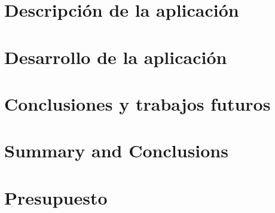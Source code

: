 \documentclass[spanish,a4paper,11pt,twoside]{report}
\begin{document}
\newpage{\pagestyle{empty}\cleardoublepage}
\thispagestyle{empty}


\chapter{Descripción de la aplicaci\'on}
\label{chapter:tres}



\newpage{\pagestyle{empty}\cleardoublepage}
\thispagestyle{empty}


\chapter{Desarrollo de la aplicaci\'on}
\label{chapter:cuatro}



\newpage{\pagestyle{empty}\cleardoublepage}
\thispagestyle{empty}

\chapter{Conclusiones y trabajos futuros}
\label{chapter:Conclusiones}



\newpage{\pagestyle{empty}\cleardoublepage}
\thispagestyle{empty}

\chapter{Summary and Conclusions }
\label{chapter:ingles}



\newpage{\pagestyle{empty}\cleardoublepage}
\thispagestyle{empty}

\chapter{Presupuesto}
\label{chapter:Presupuesto}



\end{document}
